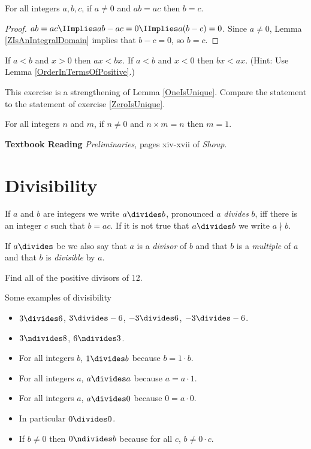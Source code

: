 \documentclass[oneside,12pt]{amsart}
\begin{document}
\begin{lemma}
\label{CancellationLaw}
For all integers $a,b,c$, if $a\not=0$
and $ab = ac$ then $b=c$.
\end{lemma}
\begin{proof}
$ab=ac\IImplies ab-ac=0 \IImplies a(b-c) = 0$. Since $a\not=0$, Lemma
\ref{ZIsAnIntegralDomain} implies that $b-c=0$, so $b=c$.
\end{proof}

\begin{homework}
If $a<b$ and $x>0$ then $ax < bx$.
If $a<b$ and $x<0$ then $bx < ax$.
(Hint: Use Lemma \ref{OrderInTermsOfPositive}.)
\end{homework}

This exercise is a strengthening of Lemma \ref{OneIsUnique}. Compare the statement
to the statement of exercise \ref{ZeroIsUnique}.
\begin{homework}
\label{StrongerOneIsUnique}
For all integers $n$ and $m$, if $n\not=0$
and $n\times m=n$ then $m=1$.
\end{homework}

\textbf{Textbook Reading}
\emph{Preliminaries}, pages xiv-xvii of \emph{Shoup}.

\newpage

\section{Divisibility}

\begin{definition}
If $a$ and $b$ are integers we write $a\divides b$, pronounced $a$ \emph{divides}
$b$, iff there is an integer $c$ such that $b=ac$. If it is not true that
$a\divides b$ we write $a\nmid b$.

If $a\divides$ be we also say that $a$ is a \emph{divisor} of $b$ and that
$b$ is a \emph{multiple} of $a$ and that $b$ is \emph{divisible} by $a$.
\end{definition}

\begin{in_class_example}
Find all of the positive divisors of 12.
\end{in_class_example}


\begin{numbered_example}
Some examples of divisibility
\begin{itemize}
\item $3\divides 6$, $3\divides -6$, $-3\divides 6$, $-3\divides -6$.
\item $3 \ndivides 8$, $6\ndivides 3$.
\item For all integers $b$, $1\divides b$ because $b = 1\cdot b$.
\item For all integers $a$, $a\divides a$ because $a = a\cdot 1$.
\item For all integers $a$, $a\divides 0$ because $0 = a\cdot 0$.
\item In particular $0\divides 0$.
\item If $b\not=0$ then $0\ndivides b$ because for all $c$, $b\not=0\cdot c$.
\end{itemize}

\end{numbered_example}
\end{document}
